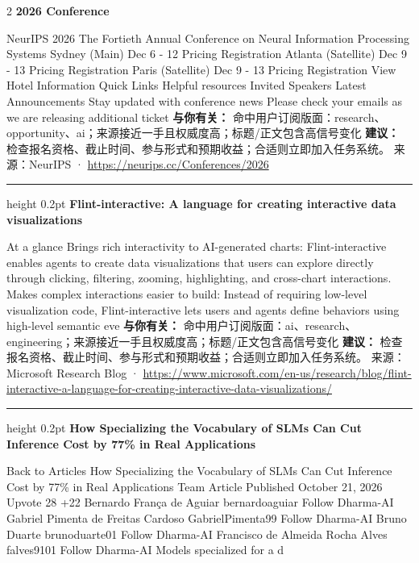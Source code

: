 \documentclass[10.5pt]{ctexart}
\begin{document}
\begin{multicols}{2}
{\large\bfseries 2026 Conference}\par
NeurIPS 2026 The Fortieth Annual Conference on Neural Information Processing Systems Sydney (Main) Dec 6 - 12 Pricing Registration Atlanta (Satellite) Dec 9 - 13 Pricing Registration Paris (Satellite) Dec 9 - 13 Pricing Registration View Hotel Information Quick Links Helpful resources Invited Speakers Latest Announcements Stay updated with conference news Please check your emails as we are releasing additional ticket
\textbf{与你有关：} 命中用户订阅版面：research、opportunity、ai；来源接近一手且权威度高；标题/正文包含高信号变化
\textbf{建议：} 检查报名资格、截止时间、参与形式和预期收益；合适则立即加入任务系统。
{\footnotesize\color{ormuted} 来源：NeurIPS · \url{https://neurips.cc/Conferences/2026}}
\vspace{2mm}
\hrule height 0.2pt
\vspace{2mm}
{\large\bfseries Flint-interactive: A language for creating interactive data visualizations}\par
At a glance Brings rich interactivity to AI-generated charts: Flint-interactive enables agents to create data visualizations that users can explore directly through clicking, filtering, zooming, highlighting, and cross-chart interactions. Makes complex interactions easier to build: Instead of requiring low-level visualization code, Flint-interactive lets users and agents define behaviors using high-level semantic eve
\textbf{与你有关：} 命中用户订阅版面：ai、research、engineering；来源接近一手且权威度高；标题/正文包含高信号变化
\textbf{建议：} 检查报名资格、截止时间、参与形式和预期收益；合适则立即加入任务系统。
{\footnotesize\color{ormuted} 来源：Microsoft Research Blog · \url{https://www.microsoft.com/en-us/research/blog/flint-interactive-a-language-for-creating-interactive-data-visualizations/}}
\vspace{2mm}
\hrule height 0.2pt
\vspace{2mm}
{\large\bfseries How Specializing the Vocabulary of SLMs Can Cut Inference Cost by 77\% in Real Applications}\par
Back to Articles How Specializing the Vocabulary of SLMs Can Cut Inference Cost by 77\% in Real Applications Team Article Published October 21, 2026 Upvote 28 +22 Bernardo França de Aguiar bernardoaguiar Follow Dharma-AI Gabriel Pimenta de Freitas Cardoso GabrielPimenta99 Follow Dharma-AI Bruno Duarte brunoduarte01 Follow Dharma-AI Francisco de Almeida Rocha Alves falves9101 Follow Dharma-AI Models specialized for a d

\end{multicols}
\end{document}

